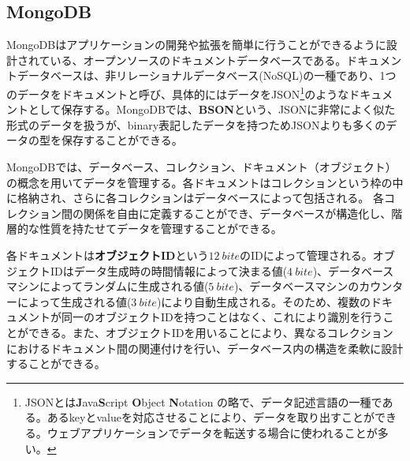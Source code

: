 \subsection{MongoDB\cite{mongo}}
\label{sec:mongo}

MongoDBはアプリケーションの開発や拡張を簡単に行うことができるように設計されている、オープンソースのドキュメントデータベースである。ドキュメントデータベースは、非リレーショナルデータベース(NoSQL)の一種であり、1つのデータをドキュメントと呼び、具体的にはデータをJSON\footnote{JSONとは\textbf{J}ava\textbf{S}cript \textbf{O}bject \textbf{N}otation の略で、データ記述言語の一種である。あるkeyとvalueを対応させることにより、データを取り出すことができる。ウェブアプリケーションでデータを転送する場合に使われることが多い。}のようなドキュメントとして保存する。MongoDBでは、\textbf{BSON}という、JSONに非常によく似た形式のデータを扱うが、binary表記したデータを持つためJSONよりも多くのデータの型を保存することができる。

MongoDBでは、データベース、コレクション、ドキュメント（オブジェクト）の概念を用いてデータを管理する。各ドキュメントはコレクションという枠の中に格納され、さらに各コレクションはデータベースによって包括される。
各コレクション間の関係を自由に定義することができ、データベースが構造化し、階層的な性質を持たせてデータを管理することができる。


各ドキュメントは\textbf{オブジェクトID}という$12\ \si{bite}$のIDによって管理される。オブジェクトIDはデータ生成時の時間情報によって決まる値($4\ \si{bite}$)、データベースマシンによってランダムに生成される値($5\ \si{bite}$)、データベースマシンのカウンターによって生成される値($3\ \si{bite}$)により自動生成される。そのため、複数のドキュメントが同一のオブジェクトIDを持つことはなく、これにより識別を行うことができる。また、オブジェクトIDを用いることにより、異なるコレクションにおけるドキュメント間の関連付けを行い、データベース内の構造を柔軟に設計することができる。

